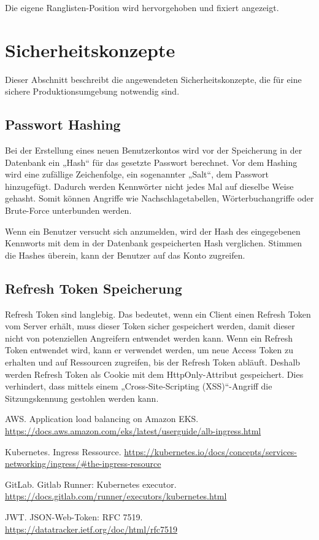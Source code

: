 \documentclass[letterpaper, 10 pt, conference]{ieeeconf}
\begin{document}
Die eigene Ranglisten-Position wird hervorgehoben und fixiert angezeigt.

\section{Sicherheitskonzepte}

Dieser Abschnitt beschreibt die angewendeten Sicherheitskonzepte, die für eine sichere Produktionsumgebung notwendig sind.

\subsection{Passwort Hashing}
Bei der Erstellung eines neuen Benutzerkontos wird vor der Speicherung in der Datenbank ein „Hash“ für das gesetzte Passwort berechnet. Vor dem Hashing wird eine zufällige Zeichenfolge, ein sogenannter „Salt“, dem Passwort hinzugefügt. Dadurch werden Kennwörter nicht jedes Mal auf dieselbe Weise gehasht. Somit können Angriffe wie Nachschlagetabellen, Wörterbuchangriffe oder Brute-Force unterbunden werden. 

Wenn ein Benutzer versucht sich anzumelden, wird der Hash des eingegebenen Kennworts mit dem in der Datenbank gespeicherten Hash verglichen.  Stimmen die Hashes überein, kann der Benutzer auf das Konto zugreifen.

\subsection{Refresh Token Speicherung} \label{refreshToken}
Refresh Token sind langlebig. Das bedeutet, wenn ein Client einen Refresh Token vom Server erhält, muss dieser Token sicher gespeichert werden, damit dieser nicht von potenziellen Angreifern entwendet werden kann. Wenn ein Refresh Token entwendet wird, kann er verwendet werden, um neue Access Token zu erhalten und auf Ressourcen zugreifen, bis der Refresh Token abläuft.  Deshalb werden Refresh Token als Cookie mit dem HttpOnly-Attribut gespeichert. Dies verhindert, dass mittels einem „Cross-Site-Scripting (XSS)“-Angriff die Sitzungskennung gestohlen werden kann. 

\vspace{3cm}

\begin{thebibliography}{99}

 AWS.  Application load balancing on Amazon EKS.  \url{https://docs.aws.amazon.com/eks/latest/userguide/alb-ingress.html}

 Kubernetes.  Ingress Ressource.  \url{https://kubernetes.io/docs/concepts/services-networking/ingress/#the-ingress-resource}

 GitLab.  Gitlab Runner: Kubernetes executor.  \url{https://docs.gitlab.com/runner/executors/kubernetes.html}

 JWT.  JSON-Web-Token: RFC 7519.  \url{https://datatracker.ietf.org/doc/html/rfc7519}

\end{thebibliography}
\end{document}
